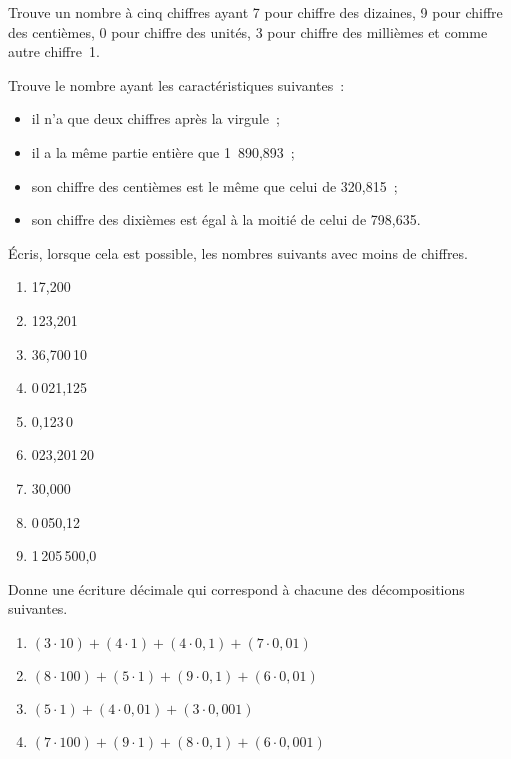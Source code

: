 \begin{exercice}
Trouve un nombre à cinq chiffres ayant 7 pour chiffre des dizaines, 9 pour chiffre des centièmes, 0 pour chiffre des unités, 3 pour chiffre des millièmes et comme autre chiffre 1.
\end{exercice}


\begin{exercice}[Devinette]
Trouve le nombre ayant les caractéristiques suivantes :
\begin{itemize}
 \item il n'a que deux chiffres après la virgule ;
 \item il a la même partie entière que 1 890,893 ;
 \item son chiffre des centièmes est le même que celui de 320,815 ;
 \item son chiffre des dixièmes est égal à la moitié de celui de 798,635.
 \end{itemize}
\end{exercice}


\begin{exercice}
Écris, lorsque cela est possible, les nombres suivants avec moins de chiffres.
\begin{enumerate} %
 \item 17,200
 \item 123,201
 \item 36,700\,10
 \item 0\,021,125
 \item 0,123\,0
 \item 023,201\,20
 \item 30,000
 \item 0\,050,12
 \item 1\,205\,500,0
 \end{enumerate}
\end{exercice}


\begin{exercice}[Décomposition]
Donne une écriture décimale qui correspond à chacune des décompositions suivantes.
\begin{enumerate}
 \item $(3 \cdot 10) + (4 \cdot 1) + (4 \cdot 0,1) + (7 \cdot 0,01)$
 \item $(8 \cdot 100) + (5 \cdot 1) + (9 \cdot 0,1) + (6 \cdot 0,01)$
 \item $(5 \cdot 1) + (4 \cdot 0,01) + (3 \cdot 0,001)$
 \item $(7 \cdot 100) + (9 \cdot 1) + (8 \cdot 0,1) + (6 \cdot 0,001)$
 \end{enumerate}
\end{exercice}


